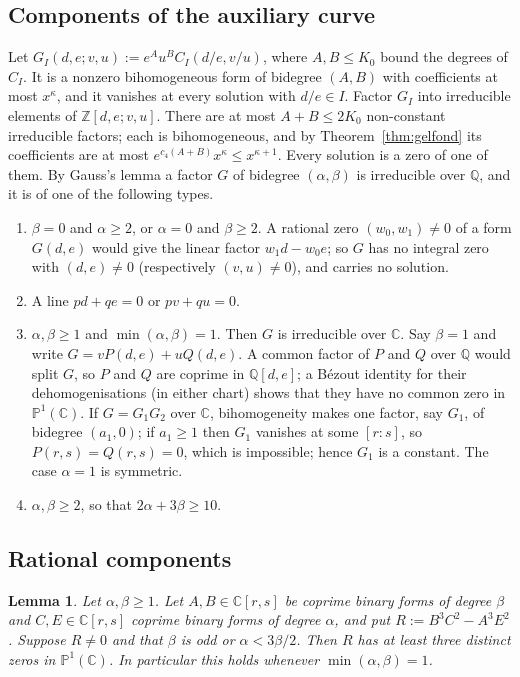 \documentclass[11pt,reqno]{amsart}
\newtheorem{lemma}[theorem]{Lemma}
\theoremstyle{definition}
\theoremstyle{remark}
\numberwithin{equation}{section}
\newcommand{\Z}{\mathbb Z}
\newcommand{\Q}{\mathbb Q}
\newcommand{\C}{\mathbb C}
\newcommand{\PP}{\mathbb P}
\begin{document}
\subsection{Components of the auxiliary curve}\label{sec:components}
Let $G_I(d,e;v,u):=e^{A}u^{B}C_I(d/e,v/u)$, where $A,B\le K_0$ bound the
degrees of $C_I$. It is a nonzero bihomogeneous form of bidegree $(A,B)$ with
coefficients at most $x^\kappa$, and it vanishes at every solution with
$d/e\in I$. Factor $G_I$ into irreducible elements of $\Z[d,e;v,u]$. There are
at most $A+B\le2K_0$ non-constant irreducible factors; each is bihomogeneous, and by
Theorem~\ref{thm:gelfond} its coefficients are at most
$e^{c_4(A+B)}x^\kappa\le x^{\kappa+1}$. Every solution is a zero of one of
them. By Gauss's lemma a factor $G$ of bidegree $(\alpha,\beta)$ is
irreducible over $\Q$, and it is of one of the following types.
\begin{enumerate}[label=(\alph*)]
\item $\beta=0$ and $\alpha\ge2$, or $\alpha=0$ and $\beta\ge2$. A rational
zero $(w_0,w_1)\ne0$ of a form $G(d,e)$ would give the linear factor
$w_1d-w_0e$; so $G$ has no integral zero with $(d,e)\ne0$ (respectively
$(v,u)\ne0$), and carries no solution.
\item[(b1)] A line $pd+qe=0$ or $pv+qu=0$.
\item[(b2)] $\alpha,\beta\ge1$ and $\min(\alpha,\beta)=1$. Then $G$ is
irreducible over $\C$. Say $\beta=1$ and write $G=vP(d,e)+uQ(d,e)$. A common
factor of $P$ and $Q$ over $\Q$ would split $G$, so $P$ and $Q$ are coprime in
$\Q[d,e]$; a Bézout identity for their dehomogenisations (in either chart)
shows that they have no common zero in $\PP^1(\C)$. If $G=G_1G_2$ over $\C$, bihomogeneity makes one factor,
say $G_1$, of bidegree $(a_1,0)$; if $a_1\ge1$ then $G_1$ vanishes at some
$[r:s]$, so $P(r,s)=Q(r,s)=0$, which is impossible; hence $G_1$ is a
constant. The case $\alpha=1$ is symmetric.
\item[(b3)] $\alpha,\beta\ge2$, so that $2\alpha+3\beta\ge10$.
\end{enumerate}

\subsection{Rational components}\label{sec:lowdeg}

\begin{lemma}\label{lem:threeroots}
Let $\alpha,\beta\ge1$. Let $A,B\in\C[r,s]$ be coprime binary forms of degree
$\beta$ and $C,E\in\C[r,s]$ coprime binary forms of degree $\alpha$, and put
$R:=B^3C^2-A^3E^2$. Suppose $R\ne0$ and that $\beta$ is odd or
$\alpha<3\beta/2$. Then $R$ has at least three distinct zeros in
$\PP^1(\C)$. In particular this holds whenever $\min(\alpha,\beta)=1$.
\end{lemma}
\end{document}
